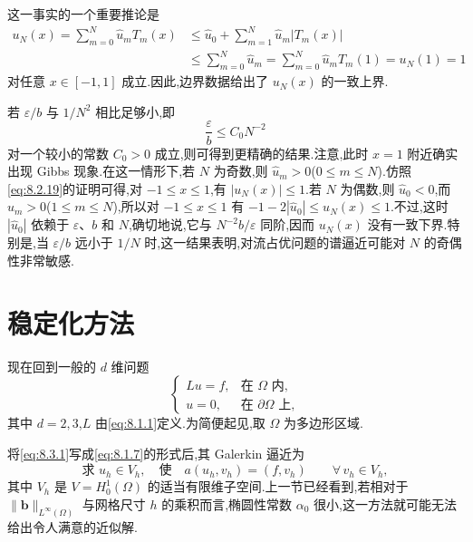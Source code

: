 这一事实的一个重要推论是
\begin{equation}\label{eq:8.2.19}
  \begin{aligned}
  u_N(x)=\sum_{m=0}^N\widehat u_m T_m(x)
     &\le \widehat u_0+\sum_{m=1}^N\widehat u_m|T_m(x)|\\
     &\le\sum_{m=0}^N\widehat u_m
       =\sum_{m=0}^N\widehat u_mT_m(1)=u_N(1)=1
  \end{aligned}
\end{equation}
对任意 \(x\in[-1,1]\) 成立.因此,边界数据给出了 \(u_N(x)\) 的一致上界.

若 \(\varepsilon/b\) 与 \(1/N^2\) 相比足够小,即
\begin{equation}\label{eq:8.2.20}
  \frac{\varepsilon}{b}\le C_0N^{-2}
\end{equation}
对一个较小的常数 \(C_0>0\) 成立,则可得到更精确的结果.注意,此时 \(x=1\) 附近确实出现 Gibbs 现象.在这一情形下,若 \(N\) 为奇数,则 \(\widehat u_m>0\)(\(0\le m\le N\)).仿照\eqref{eq:8.2.19}的证明可得,对 \(-1\le x\le1\),有 \(|u_N(x)|\le1\).若 \(N\) 为偶数,则 \(\widehat u_0<0\),而 \(\widehat u_m>0\)(\(1\le m\le N\)),所以对 \(-1\le x\le1\) 有 \(-1-2|\widehat u_0|\le u_N(x)\le1\).不过,这时 \(|\widehat u_0|\) 依赖于 \(\varepsilon\)、\(b\) 和 \(N\),确切地说,它与 \(N^{-2}b/\varepsilon\) 同阶,因而 \(u_N(x)\) 没有一致下界.特别是,当 \(\varepsilon/b\) 远小于 \(1/N\) 时,这一结果表明,对流占优问题的谱逼近可能对 \(N\) 的奇偶性非常敏感.

\section{稳定化方法}\label{sec:8.3}

现在回到一般的 \(d\) 维问题
\begin{equation}\label{eq:8.3.1}
  \begin{cases}
    Lu=f,&\text{在 }\Omega\text{ 内},\\
    u=0,&\text{在 }\partial\Omega\text{ 上},
  \end{cases}
\end{equation}
其中 \(d=2,3\),\(L\) 由\eqref{eq:8.1.1}定义.为简便起见,取 \(\Omega\) 为多边形区域.

将\eqref{eq:8.3.1}写成\eqref{eq:8.1.7}的形式后,其 Galerkin 逼近为
\begin{equation}\label{eq:8.3.2}
  \text{求 }u_h\in V_h,\quad\text{使}\quad
    a(u_h,v_h)=(f,v_h)\qquad\forall\,v_h\in V_h,
\end{equation}
其中 \(V_h\) 是 \(V=H_0^1(\Omega)\) 的适当有限维子空间.上一节已经看到,若相对于 \(\|\boldsymbol{b}\|_{L^\infty(\Omega)}\) 与网格尺寸 \(h\) 的乘积而言,椭圆性常数 \(\alpha_0\) 很小,这一方法就可能无法给出令人满意的近似解.

